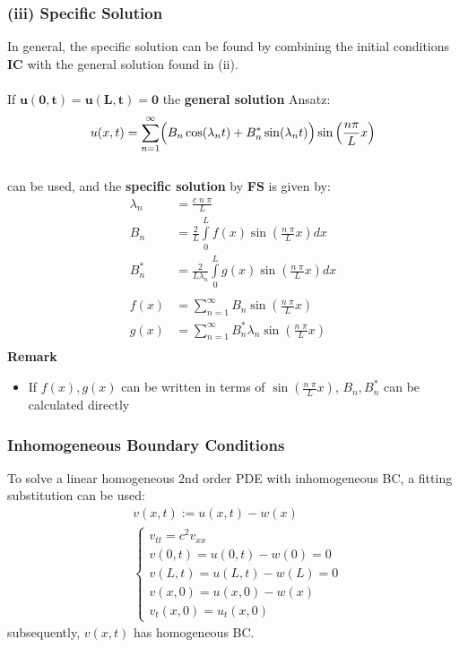 \subsubsection{(iii) Specific Solution}\label{pde/1dwave/specificSolution}
In general, the specific solution can be found by combining the initial conditions \textbf{IC}
with the general solution found in (ii).\\\hbox{}\\
If $\mathbf{u(0,t)=u(L,t)= 0}$ the \textbf{general solution} Ansatz:
\begin{equation*}
    u(x,t)=\sum\limits_{n=1}^{\infty}
    \Bigl( B_n \cos(\lambda _n t)+B_n^* \sin(\lambda_n t)\Bigr) \sin
    \left(\frac{n \pi}{L}x \right)
\end{equation*}\\
can be used, and the \textbf{specific solution} by \textbf{FS} is given by:
\begin{align*}
    \lambda_n & =\frac{c\; n\; \pi}{L}                                               \\
    B_n       & =\frac{2}{L}\int\limits_0^L f(x)\sin(\frac{n\;\pi}{L}x)dx            \\
    B_n^*     & =\frac{2}{L\lambda_n} \int\limits_0^L g(x) \sin(\frac{n\;\pi}{L}x)dx \\\\
    f(x)      & =\sum\limits_{n=1}^{\infty} B_n \sin(\frac{n\;\pi}{L}x)              \\
    g(x)      & =\sum\limits_{n=1}^{\infty} B_n^* \lambda_n \sin(\frac{n\;\pi}{L}x)  \\
\end{align*}
\textbf{Remark}
\begin{itemize}
    \item If $f(x),g(x)$ can be written in terms of $\sin(\frac{n\;\pi}{L}x)$, $B_n, B_n^*$
          can be calculated directly
\end{itemize}

\subsubsection{Inhomogeneous Boundary Conditions}
To solve a linear homogeneous 2nd order PDE with inhomogeneous BC, a fitting substitution can be used:
\begin{align*}
     & v(x,t):= u(x,t) -w(x) \\
     & \begin{cases}
           v_{tt}=c^2v_{xx}     \\
           v(0,t)=u(0,t)-w(0)=0 \\
           v(L,t)=u(L,t)-w(L)=0 \\
           v(x,0)=u(x,0)-w(x)   \\
           v_t(x,0)=u_t(x,0)
       \end{cases}
\end{align*}
subsequently, $v(x,t)$ has homogeneous BC.

